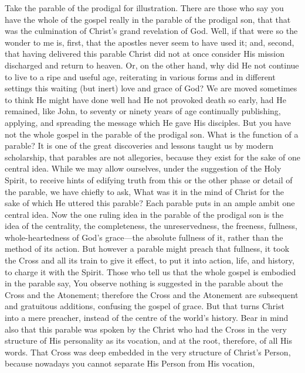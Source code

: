 \documentclass[draft]{ptfdoc}
\begin{document}
Take the parable of the prodigal for illustration. 
There are those who say you have the 
whole of the gospel really in the parable of the 
prodigal son, that that was the culmination of 
Christ's grand revelation of God. Well, if that 
were so the wonder to me is, first, that the 
apostles never seem to have used it; and, second, 
that having delivered this parable Christ did 
not at once consider His mission discharged and 
return to heaven. Or, on the other hand, why 
did He not continue to live to a ripe and useful 
age, reiterating in various forms and in different 
settings this waiting (but inert) love and grace 
of God? We are moved sometimes to think He 
might have done well had He not provoked 
death so early, had He remained, like John, to 
seventy or ninety years of age continually 
publishing, applying, and spreading the message 
which He gave His disciples. But you have not 
the whole gospel in the parable of the prodigal 
son. What is the function of a parable? It is 
one of the great discoveries and lessons taught 
us by modern scholarship, that parables are not 
allegories, because they exist for the sake of 
one central idea. While we may allow ourselves, 
under the suggestion of the Holy Spirit, 
to receive hints of edifying truth from this or 
the other phase or detail of the parable, we 
have chiefly to ask, What was it in the mind of 
Christ for the sake of which He uttered this 
parable? Each parable puts in an ample ambit 
one central idea. Now the one ruling idea in 
the parable of the prodigal son is the idea of 
the centrality, the completeness, the unreservedness, 
the freeness, fullness, whole-heartedness of 
God's grace---the absolute fullness of it, rather 
than the method of its action. But however a 
parable might preach that fullness, it took the 
Cross and all its train to give it effect, to put it 
into action, life, and history, to charge it with 
the Spirit. Those who tell us that the whole 
gospel is embodied in the parable say, You 
observe nothing is suggested in the parable 
about the Cross and the Atonement; therefore 
the Cross and the Atonement are subsequent 
and gratuitous additions, confusing the gospel 
of grace. But that turns Christ into a mere 
preacher, instead of the centre of the world's 
history. Bear in mind also that this parable was 
spoken by the Christ who had the Cross in the 
very structure of His personality as its vocation, 
and at the root, therefore, of all His words. 
That Cross was deep embedded in the very structure 
of Christ's Person, because nowadays you 
cannot separate His Person from His vocation, 
\end{document}
